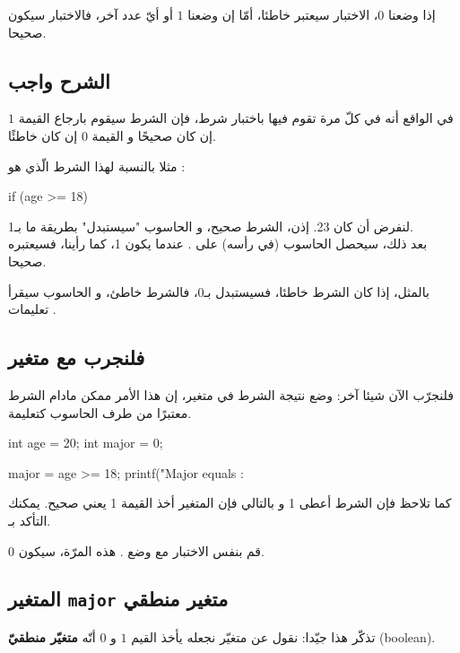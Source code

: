 إذا وضعنا $ 0 $، الاختبار سيعتبر خاطئا، أمّا إن وضعنا $ 1 $ أو أيّ عدد آخر، فالاختبار سيكون صحيحا.

\subsection{الشرح واجب}

في الواقع أنه في كلّ مرة تقوم فيها باختبار شرط، فإن الشرط سيقوم بارجاع القيمة $ 1 $ إن كان صحيحًا و القيمة $ 0 $ إن كان خاطئًا.

مثلا بالنسبة لهذا الشرط الّذي هو 
:

\begin{Csource}
if (age >= 18)
\end{Csource}

لنفرض أن
كان 23. إذن، الشرط صحيح، و الحاسوب "سيستبدل" بطريقة ما
بـ1.\\
بعد ذلك، سيحصل الحاسوب (في رأسه) على
.
عندما يكون 1، كما رأينا، فسيعتبره صحيحا.

بالمثل، إذا كان الشرط خاطئا، فسيستبدل
بـ0، فالشرط خاطئ، و الحاسوب سيقرأ تعليمات
.

\subsection{فلنجرب مع متغير}

فلنجرّب الآن شيئا آخر: وضع نتيجة الشرط في متغير، إن هذا الأمر ممكن مادام الشرط معتبرًا من طرف الحاسوب كتعليمة.

\begin{Csource}
int age = 20;
int major = 0;

major = age >= 18;
printf("Major equals : %
\end{Csource}

كما تلاحظ فإن الشرط
أعطى 1 و بالتالي فإن المتغير 
أخذ القيمة 1 يعني صحيح. يمكنك التأكد بـ.

قم بنفس الاختبار مع وضع
.
هذه المرّة،
سيكون 0.

\subsection{المتغير
\texttt{major}
متغير منطقي}

تذكّر هذا جيّدا: نقول عن متغيّر نجعله يأخذ القيم $ 1 $ و $ 0 $ أنّه
\textbf{متغيّر منطقيّ}
(\textenglish{boolean}).

